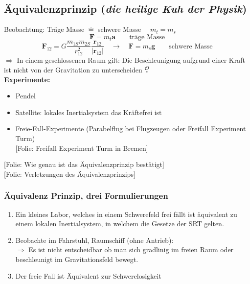 \documentclass[titlepage,11pt,a4paper,ngerman]{report}
\newcommand{\tx}[1]{\textrm{#1}}
\newcommand{\folie}[1]{\color{gray}[Folie: #1]\color{black}}
\renewcommand{\vec}[1]{\boldsymbol{#1}}
\newcommand{\mau}{$\buildrel \mathcal{O} \over{\textbf{.}}$}
\begin{document}
\subsection{Äquivalenzprinzip (\emph{die heilige Kuh der Physik})}
Beobachtung: Träge Masse $ \widehat{=} $ schwere Masse $ \quad m_t = m_s $
\begin{equation*}
\vec{F} = m_t \vec{a} \qquad \tx{träge Masse}
\end{equation*}
\begin{equation*}
\vec{F}_{12} = G \frac{m_{1S} m_{2S}}{r_{12}^2} \frac{\vec{r}_{12}}{|\vec{r}_{12}|} \quad \rightarrow \quad \vec{F} = m_s \vec{g} \qquad \tx{schwere Masse}
\end{equation*}
$ \Rightarrow $ In einem geschlossenen Raum gilt: Die Beschleunigung aufgrund einer Kraft ist nicht von der Gravitation zu unterscheiden \mau\\
\noindent
\textbf{Experimente:}
\begin{itemize}
	\item Pendel
	\item Satellite: lokales Inertialsystem das Kräftefrei ist
	\item Freie-Fall-Experimente (Parabelflug bei Flugzeugen oder Freifall Experiment Turm) \\
	\folie{Freifall Experiment Turm in Bremen}
\end{itemize}
\folie{Wie genau ist das Äquivalenzprinzip bestätigt}\\
\folie{Verletzungen des Äquivalenzprinzips}

\subsubsection{Äquivalenz Prinzip, drei Formulierungen}
\begin{enumerate}[1)]
	\item Ein kleines Labor, welches in einem Schwerefeld frei fällt ist äquivalent zu einem lokalen Inertialsystem, in welchem die Gesetze der SRT gelten.
	\item Beobachte im Fahrstuhl, Raumschiff (ohne Antrieb):\\
	$ \Rightarrow $ Es ist nicht entscheidbar ob man sich gradlinig im freien Raum oder beschleunigt im Gravitationsfeld bewegt.
	\item Der freie Fall ist Äquivalent zur Schwerelosigkeit
\end{enumerate}
\end{document}
